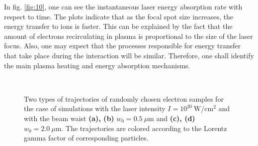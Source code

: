 In fig. \ref{fig:10}, one can see the instantaneous laser energy absorption rate with respect to time. The plots indicate that as the focal spot size increases, the energy transfer to ions is faster. This can be explained by the fact that the amount of electrons recirculating in plasma is proportional to the size of the laser focus. Also, one may expect that the processes responsible for energy transfer that take place during the interaction will be similar. Therefore, one shall identify the main plasma heating and energy absorption mechanisms.

\begin{figure}[h!]
	\centering
	\\[2mm]
	\caption{Two types of trajectories of randomly chosen electron samples for the case of simulations with the laser intensity $ I = 10^{20} \ \mathrm{W/cm^2} $ and with the beam waist \textbf{(a), (b)} $ w_0 = 0.5 \ \mu\mathrm{m} $ and \textbf{(c), (d)} $ w_0 = 2.0 \ \mu\mathrm{m} $. The trajectories are colored according to the Lorentz gamma factor of corresponding particles.}
	\label{fig:19}
\end{figure}

